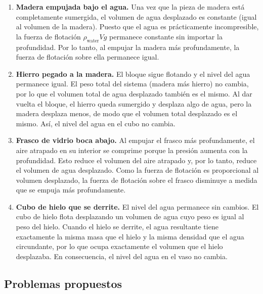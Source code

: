 \begin{enumerate}
\item \textbf{Madera empujada bajo el agua.} Una vez que la pieza de madera está completamente sumergida, el volumen de agua desplazado es constante (igual al volumen de la madera). Puesto que el agua es prácticamente incompresible, la fuerza de flotación $\rho_{\mathrm{water}} V g$ permanece constante sin importar la profundidad. Por lo tanto, al empujar la madera más profundamente, la fuerza de flotación sobre ella permanece igual.

\item \textbf{Hierro pegado a la madera.} El bloque sigue flotando y el nivel del agua permanece igual. El peso total del sistema (madera más hierro) no cambia, por lo que el volumen total de agua desplazado también es el mismo. Al dar vuelta el bloque, el hierro queda sumergido y desplaza algo de agua, pero la madera desplaza menos, de modo que el volumen total desplazado es el mismo. Así, el nivel del agua en el cubo no cambia.

\item \textbf{Frasco de vidrio boca abajo.} Al empujar el frasco más profundamente, el aire atrapado en su interior se comprime porque la presión aumenta con la profundidad. Esto reduce el volumen del aire atrapado y, por lo tanto, reduce el volumen de agua desplazado. Como la fuerza de flotación es proporcional al volumen desplazado, la fuerza de flotación sobre el frasco disminuye a medida que se empuja más profundamente.

\item \textbf{Cubo de hielo que se derrite.} El nivel del agua permanece sin cambios. El cubo de hielo flota desplazando un volumen de agua cuyo peso es igual al peso del hielo. Cuando el hielo se derrite, el agua resultante tiene exactamente la misma masa que el hielo y la misma densidad que el agua circundante, por lo que ocupa exactamente el volumen que el hielo desplazaba. En consecuencia, el nivel del agua en el vaso no cambia.
\end{enumerate}

\subsection{Problemas propuestos}

